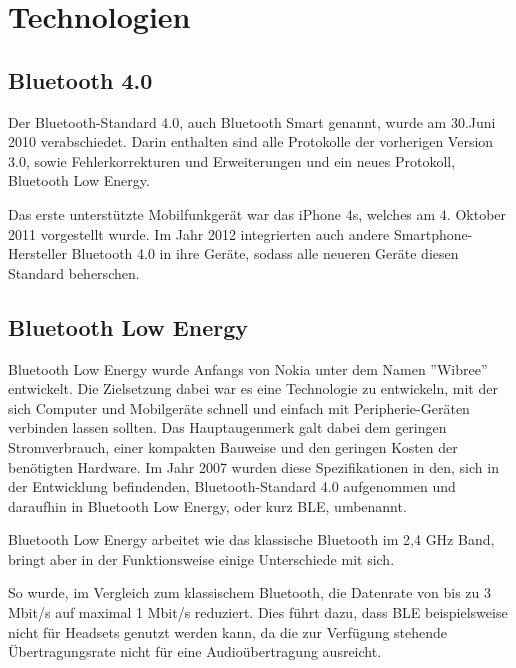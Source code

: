 \chapter{Technologien}
\label{chap:technologies}

\section{Bluetooth 4.0}
\label{sec:technologies:bluetooth4}

Der Bluetooth-Standard 4.0, auch Bluetooth Smart genannt, wurde am 30.Juni 2010 verabschiedet. Darin enthalten sind alle Protokolle der vorherigen Version 3.0, sowie Fehlerkorrekturen und Erweiterungen und ein neues Protokoll, Bluetooth Low Energy. 

Das erste unterstützte Mobilfunkgerät war das iPhone 4s, welches am 4. Oktober 2011 vorgestellt wurde. Im Jahr 2012 integrierten auch andere Smartphone-Hersteller Bluetooth 4.0 in ihre Geräte, sodass alle neueren Geräte diesen Standard beherschen.


\section{Bluetooth Low Energy}
\label{sec:technologies:bluetoothLE}

Bluetooth Low Energy wurde Anfangs von Nokia unter dem Namen ''Wibree'' entwickelt. Die Zielsetzung dabei war es eine Technologie zu entwickeln, mit der sich Computer und Mobilgeräte schnell und einfach mit Peripherie-Geräten verbinden lassen sollten. Das Hauptaugenmerk galt dabei dem geringen Stromverbrauch, einer kompakten Bauweise und den geringen Kosten der benötigten Hardware.
Im Jahr 2007 wurden diese Spezifikationen in den, sich in der Entwicklung befindenden, Bluetooth-Standard 4.0 aufgenommen und daraufhin in Bluetooth Low Energy, oder kurz BLE, umbenannt.

Bluetooth Low Energy arbeitet wie das klassische Bluetooth im 2,4 GHz Band, bringt aber in der Funktionsweise einige Unterschiede mit sich.

So wurde, im Vergleich zum klassischem Bluetooth, die Datenrate von bis zu 3 Mbit/s auf maximal 1 Mbit/s reduziert. Dies führt dazu, dass BLE beispielsweise nicht für Headsets genutzt werden kann, da die zur Verfügung stehende Übertragungsrate nicht für eine Audioübertragung ausreicht.

